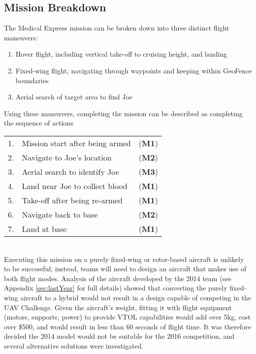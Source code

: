 \subsection{Mission Breakdown}
\label{sec:flightmaneuvers}
The Medical Express mission can be broken down into three distinct flight maneuvers:
\begin{enumerate}[label=\bfseries M\arabic*:] \itemsep-2pt
	\item Hover flight, including vertical take-off to cruising height, and landing
	\item Fixed-wing flight, navigating through waypoints and keeping within GeoFence boundaries
	\item Aerial search of target area to find Joe
\end{enumerate}

Using these maneuvers, completing the mission can be described as completing the sequence of actions\\
\begin{tabular}{r l l}
	1. & Mission start after being armed & (\textbf{M1}) \\ 
	2. & Navigate to Joe's location & (\textbf{M2}) \\ 
	3. & Aerial search to identify Joe & (\textbf{M3}) \\ 
	4. & Land near Joe to collect blood & (\textbf{M1}) \\ 
	5. & Take-off after being re-armed & (\textbf{M1}) \\ 
	6. & Navigate back to base & (\textbf{M2}) \\ 
	7. & Land at base & (\textbf{M1}) \\ 
\end{tabular}\\

Executing this mission on a purely fixed-wing or rotor-based aircraft is unlikely to be successful; instead, teams will need to design an aircraft that makes use of both flight modes. Analysis of the aircraft developed by the 2014 team (see Appendix \ref{sec:lastYear} for full details) showed that converting the purely fixed-wing aircraft to a hybrid would not result in a design capable of competing in the UAV Challenge. Given the aircraft's weight, fitting it with flight equipment (motors, supports, power) to provide VTOL capabilities would add over 5kg, cost over \$500, and would result in less than 60 seconds of flight time. It was therefore decided the 2014 model would not be suitable for the 2016 competition, and several alternative solutions were investigated.\\

